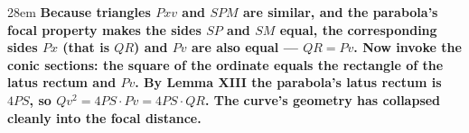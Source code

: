 \documentclass[border=4pt]{standalone}
\begin{document}
\begin{varwidth}{28em}
\large\bfseries
Because triangles $Pxv$ and $SPM$ are similar, and the parabola's focal property makes      the sides $SP$ and $SM$ equal, the corresponding sides $Px$ (that is $QR$) and $Pv$ are      also equal — $QR = Pv$. Now invoke the conic sections: the square of the      ordinate equals the rectangle of the latus rectum and $Pv$. By Lemma XIII the parabola's      latus rectum is $4PS$, so $Qv^2 = 4PS \cdot Pv = 4PS \cdot QR$. The curve's      geometry has collapsed cleanly into the focal distance.
\end{varwidth}
\end{document}
